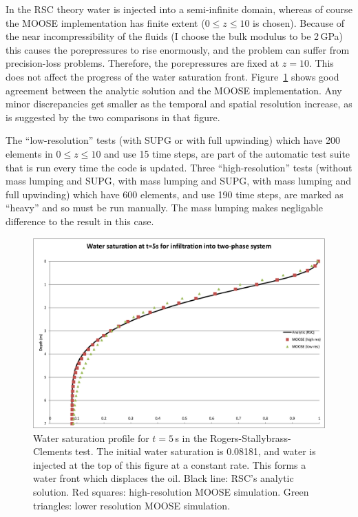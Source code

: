 \documentclass[]{scrreprt}
\begin{document}
In the RSC theory water is injected into a semi-infinite domain,
whereas of course the MOOSE implementation has finite extent ($0\leq z
\leq 10$ is chosen).  Because of the near incompressibility of the
fluids (I choose the bulk modulus to be 2\,GPa) this causes the
porepressures to rise enormously, and the problem can suffer from
precision-loss problems.  Therefore, the porepressures are fixed at
$z=10$.  This does not affect the progress of the water saturation
front.  Figure~\ref{rsc.fig} shows good agreement between the analytic
solution and the MOOSE implementation.  Any minor discrepancies get
smaller as the temporal and spatial resolution increase, as is
suggested by the two comparisons in that figure.

The ``low-resolution'' tests (with SUPG or with full upwinding) which have 200 elements in $0\leq z\leq
10$ and use 15 time steps, are part of the automatic test suite that
is run every time the code is updated.  Three ``high-resolution'' tests
(without mass lumping and SUPG, with mass lumping and SUPG, with mass
lumping and full upwinding)
which have 600 elements, and use 190 time steps, are marked as
``heavy'' and so must be run manually.  The mass lumping makes
negligable difference to the result in this case.

\begin{figure}[htb]
\begin{center}
\includegraphics[width=16cm]{rsc.eps}
\caption{Water saturation profile for $t=5$\,s in the
  Rogers-Stallybrass-Clements test.  The initial water saturation is
  0.08181, and water is injected at the top of this figure at a
  constant rate.  This forms a water front which displaces the oil.
  Black line: RSC's analytic solution.  Red squares: high-resolution
  MOOSE simulation.  Green triangles: lower resolution MOOSE simulation.}
\label{rsc.fig}
\end{center}
\end{figure}
\end{document}
